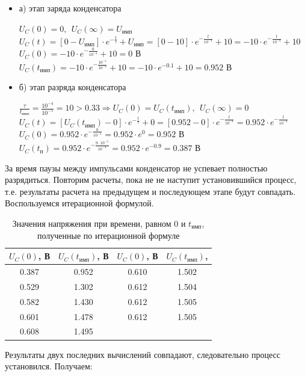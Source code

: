 \documentclass[a4paper,14pt]{extarticle}
\begin{document}
\begin{itemize}
	\item[] а) этап заряда конденсатора

	$U_C(0) = 0,\ \ U_C(\infty) = U_\text{имп}$\\	
	$U_C(t) = [0 - U_\text{имп}] \cdot e^{-\frac{t}{\tau}} + U_\text{имп} = [0 - 10] \cdot e^{-\frac{t}{10^{-4}}} + 10 = -10 \cdot e^{-\frac{t}{10^{-4}}} + 10$\\
	$U_C(0) = -10 \cdot e^{-\frac{0}{10^{-4}}} + 10 = 0 \text{ В}$\\
	$U_C(t_\text{имп}) = -10 \cdot e^{-\frac{10^{-5}}{10^{-4}}} + 10 = -10 \cdot e^{-0.1} + 10 = 0.952 \text{ В}$
	
	\item[] б) этап разряда конденсатора

	$\frac{\tau}{t_\text{имп}} = \frac{10^{-4}}{10^{-5}} = 10 > 0.33 \Rightarrow U_C(0) = U_C(t_\text{имп}),\ \ U_C(\infty) = 0$\\
	$U_C(t) = [U_C(t_\text{имп}) - 0] \cdot e^{-\frac{t}{\tau}} + 0 =  [0.952 - 0] \cdot e^{-\frac{t}{10^{-4}}} = 0.952 \cdot e^{-\frac{t}{10^{-4}}}$\\
	$U_C(0) = 0.952 \cdot e^{-\frac{0}{10^{-4}}} = 0.952 \cdot e^0 = 0.952 \text{ В}$\\
	$U_C(t_\text{п}) = 0.952 \cdot e^{-\frac{9 \cdot 10^{-5}}{10^{-4}}} = 0.952 \cdot e^{-0.9} = 0.387 \text{ В}$
\end{itemize}

За время паузы между импульсами конденсатор не успевает полностью разрядиться. Повторим расчеты, пока не не наступит установившийся процесс, т.е. результаты расчета на предыдущем и последующем этапе будут совпадать. Воспользуемся итерационной формулой.

\begin{table}[H]
\begin{center}
	\captionsetup{justification=centering,margin=2cm}
	\caption{Значения напряжения при времени, равном $0$ и $t_\text{имп}$, полученные по итерационной формуле}
	\def\arraystretch{1.3}
	\renewcommand\tabcolsep{25pt}
	\begin{tabular}{|c|c||c|c|}
		\hline 
		$U_C(0)$, В & $U_C(t_\text{имп})$, В & $U_C(0)$, В & $U_C(t_\text{имп})$, \\ 
		\hline 
		0.387 & 0.952 & 0.610 & 1.502 \\
		\hline 
		0.529 & 1.302 & 0.612 & 1.504 \\
		\hline 
		0.582 & 1.430 & 0.612 & 1.505 \\ 
		\hline 
		0.601 & 1.478 & 0.612 & 1.505 \\
		\hline 
		0.608 & 1.495 & & \\
		\hline 
	\end{tabular}
\end{center}
\end{table}
Результаты двух последних вычислений совпадают, следовательно процесс установился. Получаем:
	
\end{document}
